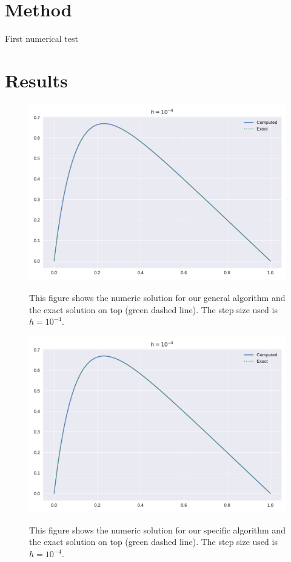 \documentclass[reprint, english,notitlepage]{revtex4-1}  %
\begin{document}
\section{Method}

First numerical test 

\section{Results}

\begin{figure}[h]
	\centering
	\includegraphics[scale=0.5]{../output/slow_4.pdf}
	\label{fig:slow_6}
	\caption{This figure shows the numeric solution for our general algorithm and the exact solution on top (green dashed line). The step size used is $h=10^{-4}$.
		\label{fig:illustrasjon}} 
\end{figure}

\begin{figure}[h]
	\centering
	\includegraphics[scale=0.5]{../output/fast_4.pdf}
	\label{fig:fast_4}
	\caption{This figure shows the numeric solution for our specific algorithm and the exact solution on top (green dashed line). The step size used is $h=10^{-4}$.
		\label{fig:illustrasjon}} 
\end{figure}
\end{document}
